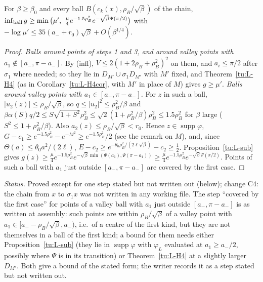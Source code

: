 \begin{lemma}\label{tu:L-balls}
For $\beta\ge\beta_0$ and every ball $B(c_k(x),\rho_B/\sqrt\beta)$ of the chain,
$\inf_{\rm ball}g\ge\min\big(\mu',\ \tfrac\mu4e^{-1.5\rho_B^2}e^{-\sqrt\beta\Psi(\pi/2)}\big)$ with
$-\log\mu'\le35(a_-+r_0)\sqrt\beta+O(\beta^{1/4})$.
\end{lemma}

\begin{proof}
\emph{Balls around points of steps 1 and 3, and around valley points with $a_1\notin[a_-,\pi-a_-]$.} By (infl), $V\le2(1+2\rho_B+\rho_B^2)^2$ on
them, and $a_i\le\pi/2$ after $\sigma_1$ where needed; so they lie in $D_{M'}\cup\sigma_1D_{M'}$ with $M'$ fixed, and
Theorem~\ref{tu:L-H4} (as in Corollary~\ref{tu:L-H4cor}, with $M'$ in place of $M$) gives $g\ge\mu'$.
\emph{Balls around valley points with $a_1\in[a_-,\pi-a_-]$.} For $z$ in such a ball, $|u_2(z)|\le\rho_B/\sqrt\beta$, so
$q\le|u_2|^2\le\rho_B^2/\beta$ and $\beta\alpha(S)q/2\le S\sqrt{1+S^2}\rho_B^2\le\sqrt2(1+\rho_B^2/\beta)\rho_B^2\le1.5\rho_B^2$ for $\beta$ large
($S^2\le1+\rho_B^2/\beta$). Also $a_2(z)\le\rho_B/\sqrt\beta<r_0$. Hence $z\in\operatorname{supp}\varphi$,
$G-c_1\ge e^{-1.5\rho_B^2}-e^{-M^2}\ge e^{-1.5\rho_B^2}/2$ (see the remark on $M$), and, since $\Theta(a)\le\theta_0a^2/(2\ell)$,
$E-c_2\ge e^{-\theta_0\rho_B^2/(2\ell\sqrt\beta)}-c_2\ge\frac12$. Proposition~\ref{tu:L-sub} gives
$g(z)\ge\frac\mu4e^{-1.5\rho_B^2}e^{-\sqrt\beta\min(\Psi(a_1),\Psi(\pi-a_1))}\ge\frac\mu4e^{-1.5\rho_B^2}e^{-\sqrt\beta\Psi(\pi/2)}$.
Points of such a ball with $a_1$ just outside $[a_-,\pi-a_-]$ are covered by the first case.
\end{proof}

\noindent\emph{Status.} Proved except for one step stated but not written out (below); change C4: the chain from $x$ to $\sigma_1x$ was not written in any working file. The step
``covered by the first case'' for points of a valley ball with $a_1$ just outside $[a_-,\pi-a_-]$ is as written at assembly: such
points are within $\rho_B/\sqrt\beta$ of a valley point with $a_1\in[a_--\rho_B/\sqrt\beta,a_-)$, i.e.\ of a centre of the first kind,
but they are not themselves in a ball of the first kind; a bound for them needs either Proposition~\ref{tu:L-sub} (they lie in
$\operatorname{supp}\varphi$ with $\varphi_L$ evaluated at $a_1\ge a_-/2$, possibly where $\Psi$ is in its transition) or
Theorem~\ref{tu:L-H4} at a slightly larger $D_{M'}$. Both give a bound of the stated form; the writer records it as a step
stated but not written out.

